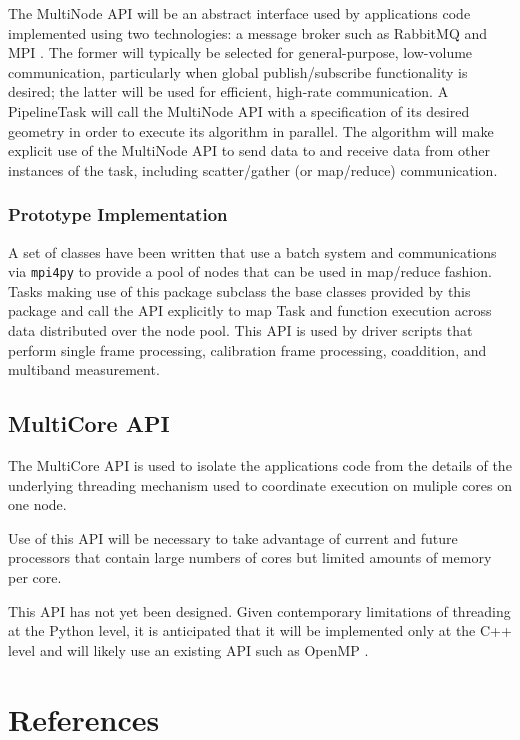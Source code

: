 \documentclass[DM,lsstdraft,toc]{lsstdoc}
\begin{document}
The MultiNode API will be an abstract interface used by applications code
implemented using two technologies: a message broker such as RabbitMQ
\citep{RabbitMQ} and MPI \citep{MPI}. The former will typically be selected for
general-purpose, low-volume communication, particularly when global
publish/subscribe functionality is desired; the latter will be used for
efficient, high-rate communication. A PipelineTask will call the MultiNode API
with a specification of its desired geometry in order to execute its algorithm
in parallel. The algorithm will make explicit use of the MultiNode API to send
data to and receive data from other instances of the task, including
scatter/gather (or map/reduce) communication.

\subsubsection{Prototype Implementation}\label{multinode-implementation}

A set of classes have been written that use a batch system and communications
via \texttt{mpi4py} \citep{mpi4py} to provide a pool of nodes that can be used
in map/reduce fashion.  Tasks making use of this package subclass the base
classes provided by this package and call the API explicitly to map Task and
function execution across data distributed over the node pool.  This API is
used by driver scripts that perform single frame processing, calibration frame
processing, coaddition, and multiband measurement.


\subsection{MultiCore API}\label{multicore-api}

The MultiCore API is used to isolate the applications code from the details of
the underlying threading mechanism used to coordinate execution on muliple
cores on one node.

Use of this API will be necessary to take advantage of current and future
processors that contain large numbers of cores but limited amounts of memory
per core.

This API has not yet been designed.  Given contemporary limitations of
threading at the Python level, it is anticipated that it will be implemented
only at the C++ level and will likely use an existing API such as OpenMP
\citep{OpenMP}.


\section{References\label{references}}
\renewcommand{\refname}{}

\end{document}
